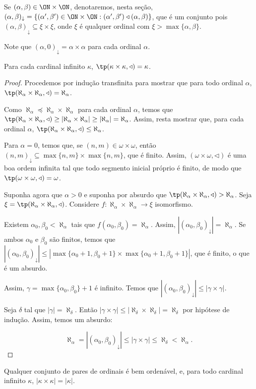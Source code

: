 Se $(\alpha, \beta)\in \ON\times \ON$, denotaremos, nesta seção, $(\alpha, \beta)_{\downarrow}=\{(\alpha', \beta')\in \ON\times \ON : (\alpha', \beta') \triangleleft (\alpha, \beta)\}$, que é um conjunto pois $(\alpha, \beta)_{\downarrow} \subseteq \xi\times \xi$, onde $\xi$ é qualquer ordinal com $\xi>\max\{\alpha, \beta\}$.

Note que $(\alpha, 0)_{\downarrow} = \alpha\times \alpha$ para cada ordinal $\alpha$.

\begin{theorem}\label{thm:quadradoDeCardinalInfinito}
    Para cada cardinal infinito $\kappa$, $\tp(\kappa\times \kappa, \triangleleft) = \kappa$.
\end{theorem}
\begin{proof}
    Procedemos por indução transfinita para mostrar que para todo ordinal $\alpha$, $\tp(\aleph_\alpha\times \aleph_\alpha, \triangleleft) = \aleph_\alpha$.

    Como $\aleph_\alpha\preceq \aleph_\alpha\times \aleph_\alpha$ para cada ordinal $\alpha$, temos que $\tp(\aleph_\alpha\times \aleph_\alpha, \triangleleft) \geq |\aleph_\alpha\times \aleph_\alpha| \geq |\aleph_\alpha| = \aleph_\alpha$.
    Assim, resta mostrar que, para cada ordinal $\alpha$, $\tp(\aleph_\alpha\times \aleph_\alpha, \triangleleft) \leq \aleph_\alpha$.

    Para $\alpha=0$, temos que, se $(n, m)\in \omega\times \omega$, então $(n, m)_{\downarrow} \subseteq \max\{n, m\}\times \max\{n, m\}$, que é finito.
    Assim, $(\omega\times \omega, \triangleleft)$ é uma boa ordem infinita tal que todo segmento inicial próprio é finito, de modo que $\tp(\omega\times \omega, \triangleleft) = \omega$.

    Suponha agora que $\alpha>0$ e suponha por absurdo que $\tp(\aleph_\alpha\times \aleph_\alpha, \triangleleft) > \aleph_\alpha$.
    Seja $\xi=\tp(\aleph_\alpha\times \aleph_\alpha, \triangleleft)$.
    Considere $f:\aleph_\alpha\times \aleph_\alpha\to \xi$ isomorfismo.

    Existem $\alpha_0, \beta_0 < \aleph_\alpha$ tais que $f(\alpha_0, \beta_0) = \aleph_\alpha$.
    Assim, $|(\alpha_0, \beta_0)_{\downarrow}|=\aleph_\alpha$.
    Se ambos $\alpha_0$ e $\beta_0$ são finitos, temos que $|(\alpha_0, \beta_0)_{\downarrow}|\leq |\max\{\alpha_0+1, \beta_0+1\}\times \max\{\alpha_0+1, \beta_0+1\}|$, que é finito, o que é um absurdo.

    Assim, $\gamma=\max\{\alpha_0, \beta_0\}+1$ é infinito.
    Temos que $|(\alpha_0, \beta_0)_{\downarrow}|\leq |\gamma\times \gamma|$.

    Seja $\delta$ tal que $|\gamma|=\aleph_\delta$.
    Então $|\gamma\times \gamma| \leq |\aleph_\delta\times \aleph_\delta|=\aleph_\delta$ por hipótese de indução.
    Assim, temos um absurdo:

    \[
        \aleph_\alpha = |(\alpha_0, \beta_0)_{\downarrow}| \leq |\gamma\times \gamma| \leq \aleph_\delta < \aleph_\alpha.
    \]
\end{proof}

\begin{corollary}\label{cor:quadradoDeCardinalInfinito}
    Qualquer conjunto de pares de ordinais é bem ordenável, e, para todo cardinal infinito $\kappa$, $|\kappa\times \kappa| = |\kappa|$.
\end{corollary}

